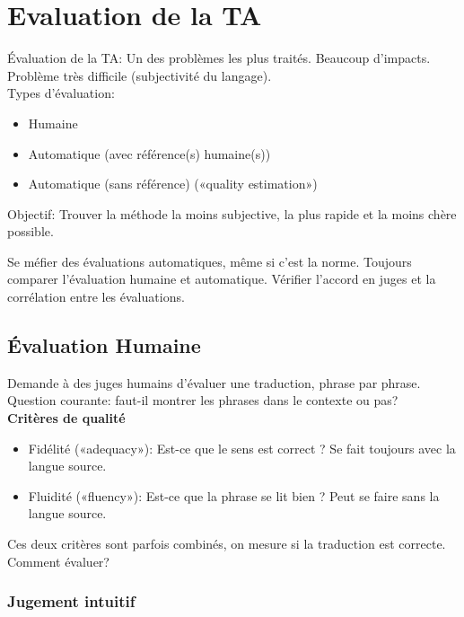 \vspace{-1.2cm}

\section{Evaluation de la TA}

Évaluation de la TA: Un des problèmes les plus traités. Beaucoup d'impacts. Problème très difficile (subjectivité du langage).\\

Types d'évaluation:

\begin{itemize}
    \item Humaine
    \item Automatique (avec référence(s) humaine(s))
    \item Automatique (sans référence) («quality estimation»)\\
\end{itemize}

Objectif: Trouver la méthode la moins subjective, la plus rapide et la moins chère possible.

Se méfier des évaluations automatiques, même si c'est la norme. Toujours comparer l'évaluation humaine et automatique. Vérifier l'accord en juges et la corrélation entre les évaluations.

\subsection{Évaluation Humaine}

Demande à des juges humains d'évaluer une traduction, phrase par phrase. Question courante: faut-il montrer les phrases dans le contexte ou pas?\\

\textbf{Critères de qualité}

\begin{itemize}
    \item Fidélité («adequacy»): Est-ce que le sens est correct ? Se fait toujours avec la langue source.
    \item Fluidité («fluency»): Est-ce que la phrase se lit bien ? Peut se faire sans la langue source. \\
\end{itemize}

Ces deux critères sont parfois combinés, on mesure si la traduction est correcte. Comment évaluer?

\subsubsection{Jugement intuitif}

